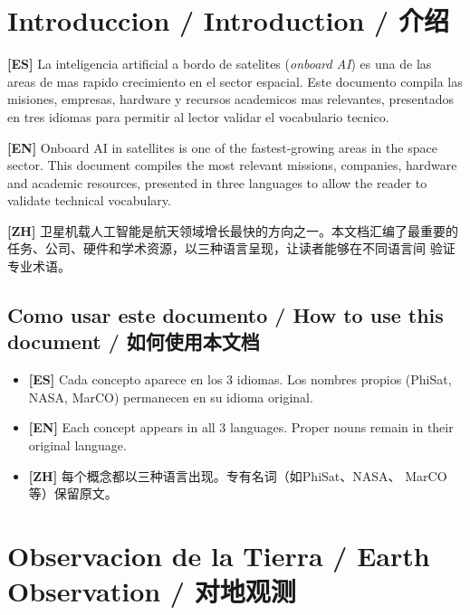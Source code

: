 \documentclass[11pt,a4paper]{report}
\begin{document}
\tableofcontents
\clearpage

\chapter{Introduccion / Introduction / 介绍}

\noindent\textbf{[ES]}\quad
La inteligencia artificial a bordo de satelites (\emph{onboard AI}) es
una de las areas de mas rapido crecimiento en el sector espacial. Este
documento compila las misiones, empresas, hardware y recursos academicos
mas relevantes, presentados en tres idiomas para permitir al lector
validar el vocabulario tecnico.

\vspace{0.5em}
\noindent\textbf{[EN]}\quad
Onboard AI in satellites is one of the fastest-growing areas in the
space sector. This document compiles the most relevant missions,
companies, hardware and academic resources, presented in three languages
to allow the reader to validate technical vocabulary.

\vspace{0.5em}
\noindent\textbf{[ZH]}\quad
卫星机载人工智能是航天领域增长最快的方向之一。本文档汇编了最重要的
任务、公司、硬件和学术资源，以三种语言呈现，让读者能够在不同语言间
验证专业术语。

\section{Como usar este documento / How to use this document / 如何使用本文档}

\begin{itemize}[leftmargin=2em]
  \item \textbf{[ES]} Cada concepto aparece en los 3 idiomas. Los nombres
        propios (PhiSat, NASA, MarCO) permanecen en su idioma original.
  \item \textbf{[EN]} Each concept appears in all 3 languages. Proper
        nouns remain in their original language.
  \item \textbf{[ZH]} 每个概念都以三种语言出现。专有名词（如PhiSat、NASA、
        MarCO等）保留原文。
\end{itemize}

\chapter{Observacion de la Tierra / Earth Observation / 对地观测}
\end{document}
